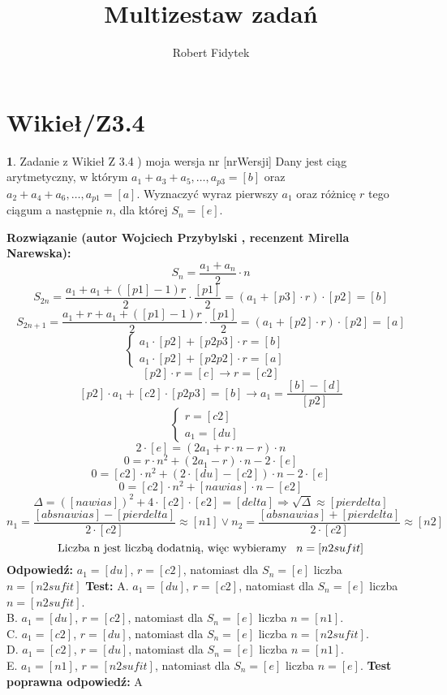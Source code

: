\documentclass[12pt, a4paper]{article}
\title{Multizestaw zadań}
\author{Robert Fidytek}
\date{}
\theoremstyle{definition} %
\newtheorem{zad}{}
\newcommand{\kategoria}[1]{\section{#1}} %
\newcommand{\zadStart}[1]{\begin{zad}#1\newline} %
\newcommand{\zadStop}{\end{zad}}   %
\newcommand{\rozwStart}[2]{\noindent \textbf{Rozwiązanie (autor #1 , recenzent #2): }\newline} %
\newcommand{\rozwStop}{\newline}                                            %
\newcommand{\odpStart}{\noindent \textbf{Odpowiedź:}\newline}    %
\newcommand{\odpStop}{\newline}                                             %
\newcommand{\testStart}{\noindent \textbf{Test:}\newline} %
\newcommand{\testStop}{\newline} %
\newcommand{\kluczStart}{\noindent \textbf{Test poprawna odpowiedź:}\newline} %
\newcommand{\kluczStop}{\newline} %
\begin{document}
\maketitle


\kategoria{Wikieł/Z3.4}
\zadStart{Zadanie z Wikieł Z 3.4 ) moja wersja nr [nrWersji]}
Dany jest ciąg arytmetyczny, w którym $a_{1}+a_{3}+a_{5},\ldots,a_{p3}=[b]$ oraz $a_{2}+a_{4}+a_{6},\ldots,a_{p1}=[a]$. Wyznaczyć wyraz pierwszy $a_{1}$ oraz różnicę $r$ tego ciągum a następnie $n$, dla której $S_{n}=[e]$.
\zadStop
\rozwStart{Wojciech Przybylski}{Mirella Narewska}
$$S_{n}=\frac{a_{1}+a_{n}}{2}\cdot n $$
$$S_{2n}=\frac{a_{1}+a_{1}+([p1]-1)r}{2}\cdot \frac{[p1]}{2}=(a_{1}+[p3]\cdot r)\cdot[p2]=[b]$$
$$S_{2n+1}=\frac{a_{1}+r+a_{1}+([p1]-1)r}{2}\cdot \frac{[p1]}{2}=(a_{1}+[p2]\cdot r)\cdot[p2]=[a]$$
$$
 \left\{ \begin{array}{ll}
a_{1}\cdot [p2]+[p2p3]\cdot r=[b] & \\
a_{1}\cdot [p2]+[p2p2]\cdot r=[a] &
\end{array} \right.
$$
$$[p2]\cdot r=[c] \rightarrow r=[c2]$$
$$[p2]\cdot a_{1}+[c2]\cdot[p2p3]=[b] \rightarrow a_{1}=\frac{[b]-[d]}{[p2]}$$
$$
 \left\{ \begin{array}{ll}
r=[c2] & \\
a_{1}=[du] &
\end{array} \right.
$$
$$2\cdot [e]=(2a_{1}+r\cdot n-r)\cdot n$$
$$0=r\cdot n^{2}+ (2a_{1}-r)\cdot n-2\cdot[e]$$
$$0=[c2]\cdot n^{2}+(2\cdot[du]-[c2])\cdot n-2\cdot[e]$$
$$0=[c2]\cdot n^{2}+[nawias]\cdot n-[e2]$$
$$\Delta=([nawias])^{2}+4\cdot[c2]\cdot[e2]=[delta]\Rightarrow\sqrt{\Delta}\approx[pierdelta]$$
$$n_{1}=\frac{[absnawias]-[pierdelta]}{2\cdot[c2]}\approx[n1] \vee n_{2}=\frac{[absnawias]+[pierdelta]}{2\cdot[c2]}\approx[n2] $$
$$\mbox{Liczba n jest liczbą dodatnią, więc wybieramy}\hspace{3mm} n=[n2sufit]$$
\rozwStop
\odpStart
$a_{1}=[du]$, $r=[c2]$, natomiast dla $S_{n}=[e]$ liczba $n=[n2sufit]$
\odpStop
\testStart
A. $a_{1}=[du]$, $r=[c2]$, natomiast dla $S_{n}=[e]$ liczba $n=[n2sufit]$.\\
B. $a_{1}=[du]$, $r=[c2]$, natomiast dla $S_{n}=[e]$ liczba $n=[n1]$.\\
C. $a_{1}=[c2]$, $r=[du]$, natomiast dla $S_{n}=[e]$ liczba $n=[n2sufit]$.\\
D. $a_{1}=[c2]$, $r=[du]$, natomiast dla $S_{n}=[e]$ liczba $n=[n1]$.\\
E. $a_{1}=[n1]$, $r=[n2sufit]$, natomiast dla $S_{n}=[e]$ liczba $n=[e]$.
\testStop
\kluczStart
A
\kluczStop
\end{document}
